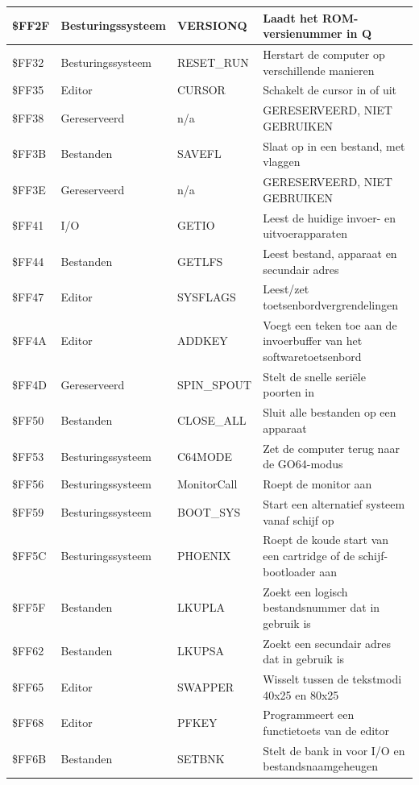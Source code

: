 \begin{longtable}{|L{1.2cm}|p{2.5cm}|p{2cm}|L{6cm}|}
\$FF2F & Besturingssysteem & VERSIONQ & Laadt het ROM-versienummer in Q \\
\hline
\$FF32 & Besturingssysteem & RESET\_RUN & Herstart de computer op verschillende manieren \\
\hline
\$FF35 & Editor & CURSOR & Schakelt de cursor in of uit \\
\hline
\$FF38 & Gereserveerd & n/a & GERESERVEERD, NIET GEBRUIKEN \\
\hline
\$FF3B & Bestanden & SAVEFL & Slaat op in een bestand, met vlaggen \\
\hline
\$FF3E & Gereserveerd & n/a & GERESERVEERD, NIET GEBRUIKEN \\
\hline
\$FF41 & I/O & GETIO & Leest de huidige invoer- en uitvoerapparaten \\
\hline
\$FF44 & Bestanden & GETLFS & Leest bestand, apparaat en secundair adres \\
\hline
\$FF47 & Editor & SYSFLAGS & Leest/zet toetsenbordvergrendelingen \\
\hline
\$FF4A & Editor & ADDKEY & Voegt een teken toe aan de invoerbuffer van het softwaretoetsenbord \\
\hline
\$FF4D & Gereserveerd & SPIN\_SPOUT & Stelt de snelle seriële poorten in \\
\hline
\$FF50 & Bestanden & CLOSE\_ALL & Sluit alle bestanden op een apparaat \\
\hline
\$FF53 & Besturingssysteem & C64MODE & Zet de computer terug naar de GO64-modus \\
\hline
\$FF56 & Besturingssysteem & MonitorCall & Roept de monitor aan \\
\hline
\$FF59 & Besturingssysteem & BOOT\_SYS & Start een alternatief systeem vanaf schijf op \\
\hline
\$FF5C & Besturingssysteem & PHOENIX & Roept de koude start van een cartridge of de schijf-bootloader aan \\
\hline
\$FF5F & Bestanden & LKUPLA & Zoekt een logisch bestandsnummer dat in gebruik is \\
\hline
\$FF62 & Bestanden & LKUPSA & Zoekt een secundair adres dat in gebruik is \\
\hline
\$FF65 & Editor & SWAPPER & Wisselt tussen de tekstmodi 40x25 en 80x25 \\
\hline
\$FF68 & Editor & PFKEY & Programmeert een functietoets van de editor \\
\hline
\$FF6B & Bestanden & SETBNK & Stelt de bank in voor I/O en bestandsnaamgeheugen \\

\end{longtable}
